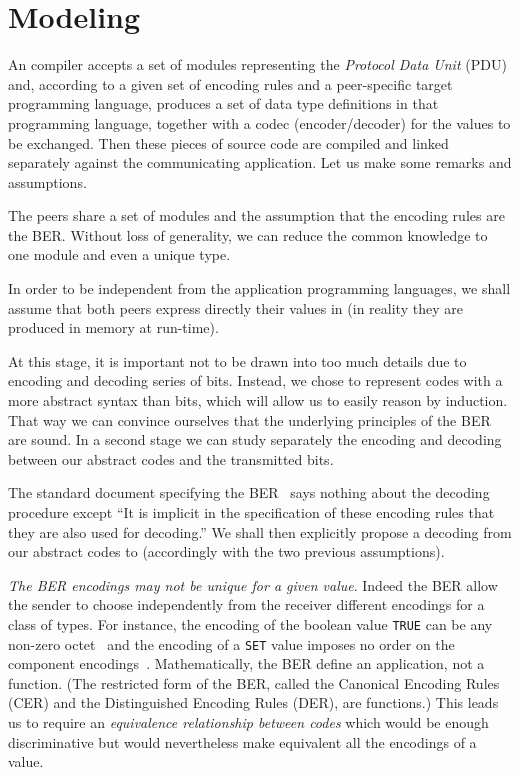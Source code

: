 
\section{Modeling}
\label{modeling}

An \ASN compiler accepts a set of \ASN modules representing the
\emph{Protocol Data Unit} (PDU) and, according to a given set of
encoding rules and a peer-specific target programming language,
produces a set of data type definitions in that programming language,
together with a codec (encoder/decoder) for the values to be
exchanged. Then these pieces of source code are compiled and linked
separately against the communicating application. Let us make some
remarks and assumptions.

\begin{itemize}

  \bitem The peers share a set of \ASN modules and the assumption that
  the encoding rules are the BER. Without loss of generality, we can
  reduce the common knowledge to one module and even a unique \ASN
  type.

  \bitem In order to be independent from the application programming
  languages, we shall assume that both peers express directly their
  values in \ASN (in reality they are produced in memory at run-time).

  \bitem At this stage, it is important not to be drawn into too much
  details due to encoding and decoding series of bits. Instead, we
  chose to represent codes with a more abstract syntax than bits,
  which will allow us to easily reason by induction. That way we can
  convince ourselves that the underlying principles of the BER are
  sound. In a second stage we can study separately the encoding and
  decoding between our abstract codes and the transmitted bits.

  \bitem The standard document specifying the BER~\cite{X.690:2002}
  says nothing about the decoding procedure except ``It is implicit in
  the specification of these encoding rules that they are also used
  for decoding.'' We shall then explicitly propose a decoding from our
  abstract codes to \ASN (accordingly with the two previous
  assumptions).

  \bitem \emph{The BER encodings may not be unique for a given
  value}. Indeed the BER allow the sender to choose independently from
  the receiver different encodings for a class of types. For instance,
  the encoding of the boolean value \texttt{TRUE} can be any non-zero
  octet~\cite[\S{8.2.2}]{X.690:2002} and the encoding of a
  \texttt{SET} value imposes no order on the component
  encodings~\cite[\textsc{note} in
  \S{8.11.3}]{X.690:2002}. Mathematically, the BER define an
  application, not a function. (The restricted form of the BER, called
  the Canonical Encoding Rules (CER) and the Distinguished Encoding
  Rules (DER), are functions.) This leads us to require an
  \emph{equivalence relationship between codes} which would be
  enough discriminative but would nevertheless make equivalent all the
  encodings of a value.

\end{itemize}

